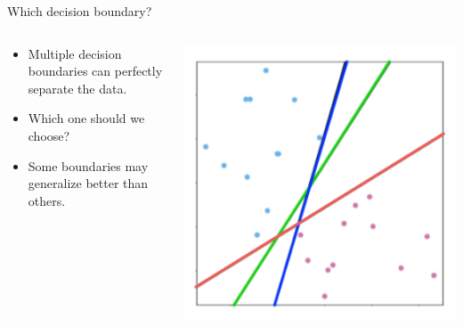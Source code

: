 \begin{frame}{Which decision boundary?}
\begin{columns}
  \begin{column}{0.5\textwidth}
    \begin{itemize}
      \item Multiple decision boundaries can perfectly separate the data.
      \item Which one should we choose?
      \item Some boundaries may generalize better than others.
    \end{itemize}
  \end{column}
  \begin{column}{0.5\textwidth}
    \centering
    \includegraphics[width=\linewidth]{images/support-vector-machines/support-vector-machines-7.png}
  \end{column}
\end{columns}
\end{frame}


